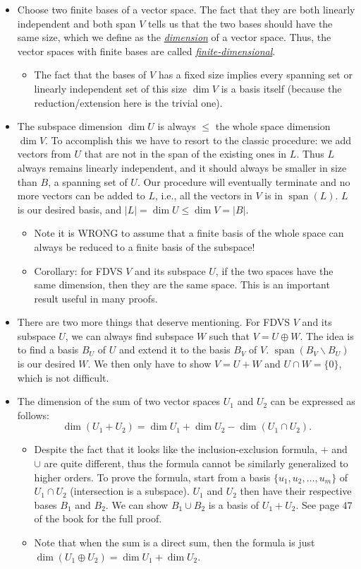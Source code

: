 \documentclass{article}
\newcommand{\df}[1]{\ul{\textit{#1}}}
\newcommand{\s}{\operatorname{span}}
\renewcommand{\d}{\dim}
\begin{document}
\begin{itemize}
    \item Choose two finite bases of a vector space. The fact that they are both linearly independent and both span $V$ tells us that the two bases should have the same size, which we define as the \df{dimension} of a vector space. Thus, the vector spaces with finite bases are called \df{finite-dimensional}.
    \begin{itemize}
        \item The fact that the bases of $V$ has a fixed size implies every spanning set or linearly independent set of this size $\d V$ is a basis itself (because the reduction/extension here is the trivial one).
    \end{itemize}
    \item The subspace dimension $\d U$ is always $\leq$ the whole space dimension $\d V$. To accomplish this we have to resort to the classic procedure: we add vectors from $U$ that are not in the span of the existing ones in $L$. Thus $L$ always remains linearly independent, and it should always be smaller in size than $B$, a spanning set of $U$. Our procedure will eventually terminate and no more vectors can be added to $L$, i.e., all the vectors in $V$ is in $\s(L)$. $L$ is our desired basis, and $|L| = \d U \leq \d V = |B|$.
    \begin{itemize}
        \item Note it is WRONG to assume that a finite basis of the whole space can always be reduced to a finite basis of the subspace!
        \item Corollary: for FDVS $V$ and its subspace $U$, if the two spaces have the same dimension, then they are the same space. This is an important result useful in many proofs.
    \end{itemize}
    \item There are two more things that deserve mentioning. For FDVS $V$ and its subspace $U$, we can always find subspace $W$ such that $V = U \oplus W$. The idea is to find a basis $B_U$ of $U$ and extend it to the basis $B_V$ of $V$. $\s (B_V \backslash B_U)$ is our desired $W$. We then only have to show $V = U+W$ and $U \cap W = \{0\}$, which is not difficult.
    \item The dimension of the sum of two vector spaces $U_1$ and $U_2$ can be expressed as follows: $$\d (U_1 + U_2) = \d U_1 + \d U_2 - \d (U_1 \cap U_2).$$
    \begin{itemize}
        \item Despite the fact that it looks like the inclusion-exclusion formula, $+$ and $\cup$ are quite different, thus the formula cannot be similarly generalized to higher orders. To prove the formula, start from a basis $\{u_1,u_2,\dots,u_m\}$ of $U_1 \cap U_2$ (intersection is a subspace). $U_1$ and $U_2$ then have their respective bases $B_1$ and $B_2$. We can show $B_1 \cup B_2$ is a basis of $U_1 + U_2$. See page 47 of the book for the full proof.
        \item Note that when the sum is a direct sum, then the formula is just $\d(U_1 \oplus U_2) = \d U_1 + \d U_2$.
    \end{itemize}
    
\end{itemize}
\end{document}
